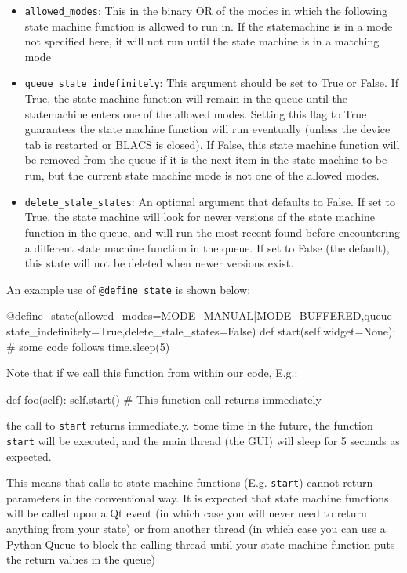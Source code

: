 \documentclass[12pt]{article}
\begin{document}
\begin{itemize}
	\item \texttt{allowed\_modes}: This in the binary OR of the modes in which the following state machine function is allowed to run in. If the statemachine is in a mode not specified here, it will not run until the state machine is in a matching mode
	\item \texttt{queue\_state\_indefinitely}: This argument should be set to True or False.
	If True, the state machine function will remain in the queue until the statemachine enters one of the allowed modes. 
	Setting this flag to True guarantees the state machine function will run eventually (unless the device tab is restarted or BLACS is closed). 
	If False, this state machine function will be removed from the queue if it is the next item in the state machine to be run, but the current state machine mode is not one of the allowed modes.
	\item \texttt{delete\_stale\_states}: An optional argument that defaults to False. If set to True, the state machine will look for newer versions of the state machine function in the queue, and will run the most recent found before encountering a different state machine function in the queue. If set to False (the default), this state will not be deleted when newer versions exist.
\end{itemize}

An example use of \texttt{@define\_state} is shown below:
\begin{python}
    @define_state(allowed_modes=MODE_MANUAL|MODE_BUFFERED,queue_state_indefinitely=True,delete_stale_states=False)
    def start(self,widget=None):
        # some code follows
        time.sleep(5)
\end{python}

Note that if we call this function from within our code, E.g.:
\begin{python}
    def foo(self):
        self.start() # This function call returns immediately
\end{python}
the call to \texttt{start} returns immediately. Some time in the future, the function \texttt{start} will be executed, and the main thread (the GUI) will sleep for 5 seconds as expected.

This means that calls to state machine functions (E.g. \texttt{start}) cannot return parameters in the conventional way. It is expected that state machine functions will be called upon a Qt event (in which case you will never need to return anything from your state) or from another thread (in which case you can use a Python Queue to block the calling thread until your state machine function puts the return values in the queue)
\end{document}
